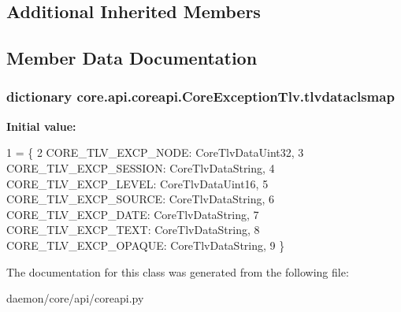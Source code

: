 \subsection*{Additional Inherited Members}


\subsection{Member Data Documentation}
\hypertarget{classcore_1_1api_1_1coreapi_1_1_core_exception_tlv_ae3e90ac1dba12fde82398a9770c0c7ad}{
\subsubsection[{tlvdataclsmap}]{\setlength{\rightskip}{0pt plus 5cm}dictionary core.\+api.\+coreapi.\+Core\+Exception\+Tlv.\+tlvdataclsmap\hspace{0.3cm}{\ttfamily [static]}}}\label{classcore_1_1api_1_1coreapi_1_1_core_exception_tlv_ae3e90ac1dba12fde82398a9770c0c7ad}
{\bfseries Initial value\+:}
\begin{DoxyCode}
1 = \{
2         CORE\_TLV\_EXCP\_NODE: CoreTlvDataUint32,
3         CORE\_TLV\_EXCP\_SESSION: CoreTlvDataString,
4         CORE\_TLV\_EXCP\_LEVEL: CoreTlvDataUint16,
5         CORE\_TLV\_EXCP\_SOURCE: CoreTlvDataString,
6         CORE\_TLV\_EXCP\_DATE: CoreTlvDataString,
7         CORE\_TLV\_EXCP\_TEXT: CoreTlvDataString,
8         CORE\_TLV\_EXCP\_OPAQUE: CoreTlvDataString,
9     \}
\end{DoxyCode}


The documentation for this class was generated from the following file\+:\begin{DoxyCompactItemize}
\item 
daemon/core/api/coreapi.\+py\end{DoxyCompactItemize}
